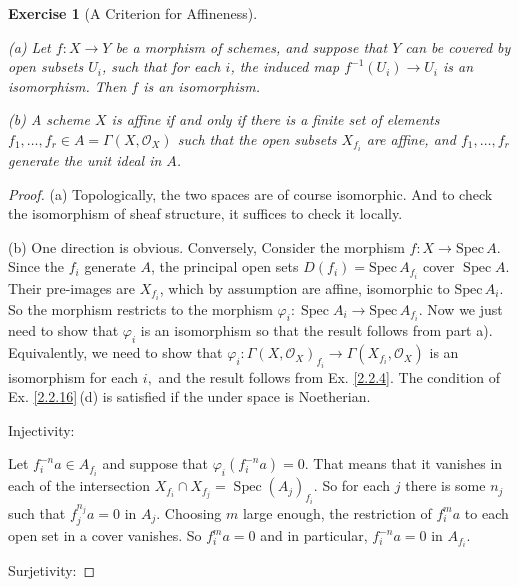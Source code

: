 \documentclass{amsart}
\newtheorem{exe}{Exercise}[subsection]
\theoremstyle{remark}\newtheorem{rmk}[theorem]{Remark}
\begin{document}
\begin{exe}[A Criterion for Affineness]
	\label{2.2.17}
	\ 
	
(a) Let $f: X \rightarrow Y$ be a morphism of schemes, and suppose that $Y$ can be covered by open subsets $U_{i}$, such that for each $i$, the induced map $f^{-1}\left(U_{i}\right) \rightarrow U_{i}$ is an isomorphism. Then $f$ is an isomorphism.

(b) A scheme $X$ is affine if and only if there is a finite set of elements $f_{1}, \ldots, f_{r} \in A=\Gamma\left(X, \mathcal{O}_{X}\right)$ such that the open subsets $X_{f_{i}}$ are affine, and $f_{1}, \ldots, f_{r}$ generate the unit ideal in $A$.
\end{exe}
\begin{proof}
(a) Topologically, the two spaces are of course isomorphic. And to check the isomorphism of sheaf structure, it suffices to check it locally.

(b) One direction is obvious. Conversely,  Consider the morphism $f: X \rightarrow \mathrm{Spec}\, A$.  Since the $f_{i}$ generate $A$, the principal open sets $D\left(f_{i}\right)=\mathrm{Spec}\, A_{f_{i}}$ cover $\operatorname{Spec} A$. Their pre-images are $X_{f_{i}}$, which by assumption are affine, isomorphic to $\mathrm{Spec}\, A_{i}$. So the morphism restricts to the morphism $\varphi_{i}: \operatorname{Spec} A_{i} \rightarrow \mathrm{Spec}\, A_{f_{i}}$. Now we just need to show that $\varphi_{i}$ is an isomorphism so that the result follows from part a). Equivalently, we need to show that $\varphi_{i}: \Gamma\left(X, \mathcal{O}_{X}\right)_{f_{i}} \rightarrow \Gamma\left(X_{f_{i}}, \mathcal{O}_{X}\right)$
is an isomorphism for each $i,$  and the result follows from Ex. \ref{2.2.4}.  The condition of Ex. \ref{2.2.16}\,(d) is satisfied if the under space is Noetherian.  

Injectivity:

Let $f_{i}^{-n}a \in A_{f_{i}}$ and suppose that $\varphi_{i}\left(f_{i}^{-n}a\right)=0$. That means that it vanishes in each of the intersection $X_{f_{i}} \cap X_{f_{j}}=\operatorname{Spec}\left(A_{j}\right)_{f_{i}}$.  So for each $j$ there is some $n_{j}$ such that $f_{j}^{n_{j}}a=0$ in $A_{j} .$ Choosing $m$ large enough, the restriction of $f_{i}^{m} a$ to each open set in a cover vanishes. So $f_{i}^{m} a=0$ and in particular, $f_{i}^{-n}a=0$ in $A_{f_{i}}$.

Surjetivity:


\end{proof}
\end{document}
